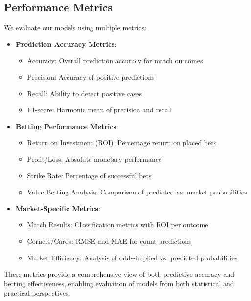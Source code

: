 \documentclass[conference]{IEEEtran}
\begin{document}
\subsection{Performance Metrics}
We evaluate our models using multiple metrics:
\begin{itemize}
\item \textbf{Prediction Accuracy Metrics}:
    \begin{itemize}
    \item Accuracy: Overall prediction accuracy for match outcomes
    \item Precision: Accuracy of positive predictions
    \item Recall: Ability to detect positive cases
    \item F1-score: Harmonic mean of precision and recall
    \end{itemize}
\item \textbf{Betting Performance Metrics}:
    \begin{itemize}
    \item Return on Investment (ROI): Percentage return on placed bets
    \item Profit/Loss: Absolute monetary performance
    \item Strike Rate: Percentage of successful bets
    \item Value Betting Analysis: Comparison of predicted vs. market probabilities
    \end{itemize}
\item \textbf{Market-Specific Metrics}:
    \begin{itemize}
    \item Match Results: Classification metrics with ROI per outcome
    \item Corners/Cards: RMSE and MAE for count predictions
    \item Market Efficiency: Analysis of odds-implied vs. predicted probabilities
    \end{itemize}
\end{itemize}

These metrics provide a comprehensive view of both predictive accuracy and betting effectiveness, enabling evaluation of models from both statistical and practical perspectives.
\end{document}
